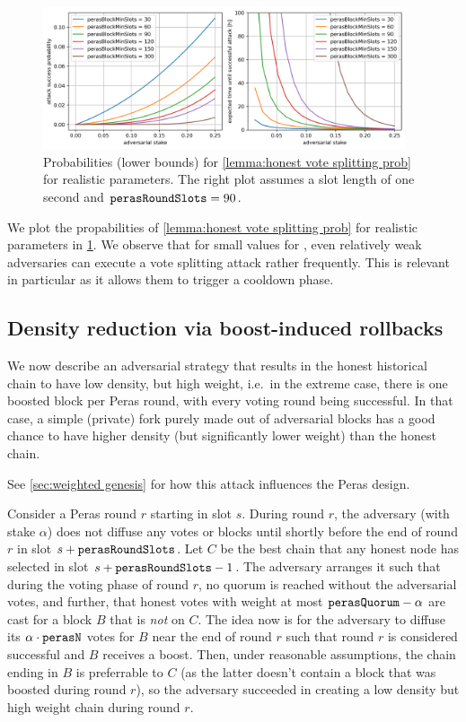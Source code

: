 \begin{figure}[h]
  \includegraphics[width=0.95\textwidth]{./appendix/plot-honest-vote-splitting.png}
  \centering
  \caption{Probabilities (lower bounds) for \cref{lemma:honest vote splitting prob} for realistic parameters. The right plot assumes a slot length of one second and $\mathtt{perasRoundSlots} = 90$.}\label{fig:honest vote splitting prob}
\end{figure}
We plot the propabilities of \cref{lemma:honest vote splitting prob} for realistic parameters in \cref{fig:honest vote splitting prob}.
We observe that for small values for \perasBlockMinSlots{}, even relatively weak adversaries can execute a vote splitting attack rather frequently.
This is relevant in particular as it allows them to trigger a cooldown phase.

\subsection{Density reduction via boost-induced rollbacks}\label{sec:density reduction via boost-induced rollbacks}

We now describe an adversarial strategy that results in the honest historical chain to have low density, but high weight, i.e.\ in the extreme case, there is one boosted block per Peras round, with every voting round being successful.
In that case, a simple (private) fork purely made out of adversarial blocks has a good chance to have higher density (but significantly lower weight) than the honest chain.

See \cref{sec:weighted genesis} for how this attack influences the Peras design.

Consider a Peras round $r$ starting in slot $s$.
During round $r$, the adversary (with stake $\alpha$) does not diffuse any votes or blocks until shortly before the end of round $r$ in slot $s+\mathtt{perasRoundSlots}$.
Let $C$ be the best chain that any honest node has selected in slot $s+\mathtt{perasRoundSlots}-1$.
The adversary arranges it such that during the voting phase of round $r$, no quorum is reached without the adversarial votes, and further, that honest votes with weight at most $\mathtt{perasQuorum} - \alpha$ are cast for a block $B$ that is \emph{not} on $C$.
The idea now is for the adversary to diffuse its $\alpha\cdot\mathtt{perasN}$ votes for $B$ near the end of round $r$ such that round $r$ is considered successful and $B$ receives a boost.
Then, under reasonable assumptions, the chain ending in $B$ is preferrable to $C$ (as the latter doesn't contain a block that was boosted during round $r$), so the adversary succeeded in creating a low density but high weight chain during round $r$.

